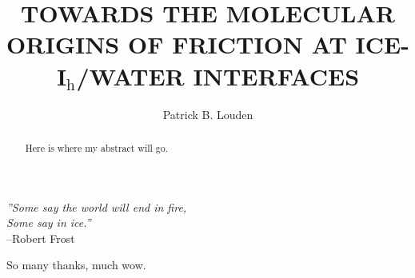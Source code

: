 \documentclass[noinfo,final,sort&compress]{nddiss2e}
\begin{document}
\frontmatter %

\title{TOWARDS THE MOLECULAR ORIGINS OF FRICTION AT
  ICE-I$_\mathrm{h}$/WATER INTERFACES}
\author{Patrick B. Louden}
\maketitle

\makecopyright

\begin{abstract}
Here is where my abstract will go.
\end{abstract}


\tableofcontents
\listoffigures
\listoftables

\begin{preface}
\vfill
\begin{flushright}
\textit{''Some say the world will end in fire,} \\
\textit{Some say in ice.''}\\
--Robert Frost
\end{flushright}
\vfill
\end{preface}

\begin{acknowledge}
So many thanks, much wow.
\end{acknowledge}

\mainmatter

%




\end{document}
